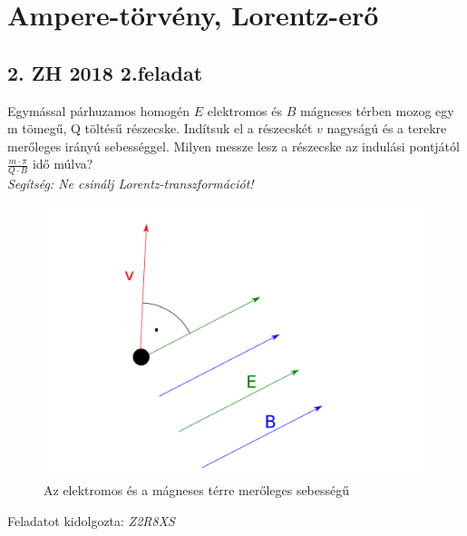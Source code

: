 \documentclass[11pt,a4paper,openany,leqno]{article}
\begin{document}
\section{Ampere-törvény, Lorentz-erő}
\subsection{2. ZH 2018 2.feladat}


Egymással párhuzamos homogén $E$ elektromos és $B$ mágneses térben mozog egy m tömegű,
Q töltésű részecske. Indítsuk el a részecskét $v$ nagyságú és a terekre merőleges irányú sebességgel. Milyen messze lesz a részecske az indulási pontjától $\frac{m\cdot \pi}{Q\cdot B}$ idő múlva?\\ \indent
{\it Segítség: Ne csinálj Lorentz-transzformációt!}

\begin{figure}[h!]
\centering
  \includegraphics[width=120mm,scale=0.5]{abra.pdf}
  \caption{Az elektromos és a mágneses térre merőleges sebességű}
  \label{}
\end{figure} 


\begin{flushright} {Feladatot kidolgozta: {\it Z2R8XS}} \end{flushright}

\vspace{0.5cm}
\end{document}
